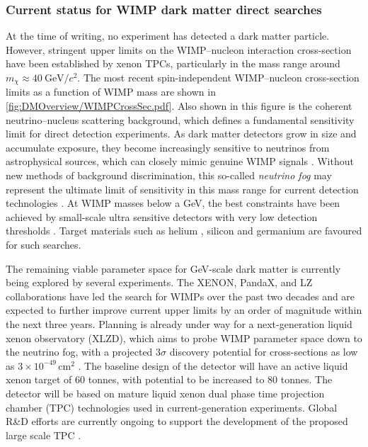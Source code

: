 \pagebreak

\subsubsection{Current status for WIMP dark matter direct searches}\label{sec:DMOverview/DMCurrentStatus}
At the time of writing, no experiment has detected a dark matter particle. However, stringent upper limits on the WIMP–nucleon interaction cross-section have been established by xenon TPCs, particularly in the mass range around $m_\chi \approx 40~\text{GeV}/c^2$. The most recent spin-independent WIMP–nucleon cross-section limits as a function of WIMP mass are shown in \autoref{fig:DMOverview/WIMPCrossSec.pdf}. Also shown in this figure is the coherent neutrino–nucleus scattering background, which defines a fundamental sensitivity limit for direct detection experiments. As dark matter detectors grow in size and accumulate exposure, they become increasingly sensitive to neutrinos from astrophysical sources, which can closely mimic genuine WIMP signals \cite{Billard:2013qya}. Without new methods of background discrimination, this so-called \textit{neutrino fog} may represent the ultimate limit of sensitivity in this mass range for current detection technologies \cite{Boehm:2018sux}. At WIMP masses below a GeV, the best constraints have been achieved by small-scale ultra sensitive detectors with very low detection thresholds \cite{mwilliams:thesis}. Target materials such as helium \cite{SPICE:2023tru}, silicon \cite{TESSERACT:2025tfw,DAMIC:2020cut} and germanium \cite{SuperCDMS:2017nns} are favoured for such searches.

The remaining viable parameter space for GeV-scale dark matter is currently being explored by several experiments. The XENON, PandaX, and LZ collaborations have led the search for WIMPs over the past two decades and are expected to further improve current upper limits by an order of magnitude within the next three years. Planning is already under way for a next-generation liquid xenon observatory (XLZD), which aims to probe WIMP parameter space down to the neutrino fog, with a projected $3\sigma$ discovery potential for cross-sections as low as $3\times10^{-49}\,\text{cm}^2$ \cite{XLZD:2024nsu}. The baseline design of the detector will have an active liquid xenon target of 60 tonnes, with potential to be increased to 80 tonnes. The detector will be based on mature liquid xenon dual phase time projection chamber (TPC) technologies used in current-generation experiments. Global R\&D efforts are currently ongoing to support the development of the proposed large scale TPC \cite{Brown:2023vgf,Baudis:2023ywo}.

